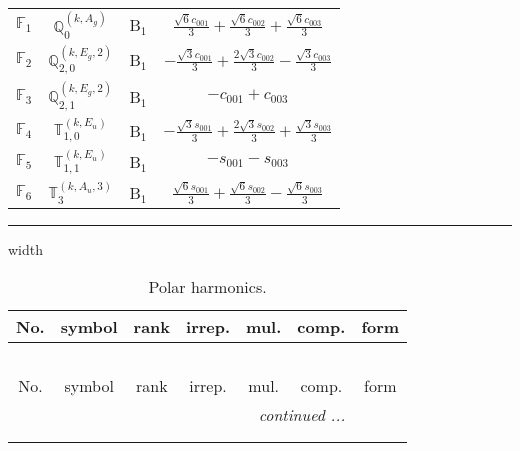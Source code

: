 \documentclass[fleqn,10pt,landscape]{article}
\begin{document}
\begin{itemize}
\begin{center}
\begin{longtable}{c|c|c|c}
$ \mathbb{F}_{1} $ & $\mathbb{Q}_{0}^{(k,A_{g})}$ & B$_{1}$ & $\frac{\sqrt{6} c_{001}}{3} + \frac{\sqrt{6} c_{002}}{3} + \frac{\sqrt{6} c_{003}}{3}$ \\
$ \mathbb{F}_{2} $ & $\mathbb{Q}_{2,0}^{(k,E_{g},2)}$ & B$_{1}$ & $- \frac{\sqrt{3} c_{001}}{3} + \frac{2 \sqrt{3} c_{002}}{3} - \frac{\sqrt{3} c_{003}}{3}$ \\
$ \mathbb{F}_{3} $ & $\mathbb{Q}_{2,1}^{(k,E_{g},2)}$ & B$_{1}$ & $- c_{001} + c_{003}$ \\
$ \mathbb{F}_{4} $ & $\mathbb{T}_{1,0}^{(k,E_{u})}$ & B$_{1}$ & $- \frac{\sqrt{3} s_{001}}{3} + \frac{2 \sqrt{3} s_{002}}{3} + \frac{\sqrt{3} s_{003}}{3}$ \\
$ \mathbb{F}_{5} $ & $\mathbb{T}_{1,1}^{(k,E_{u})}$ & B$_{1}$ & $- s_{001} - s_{003}$ \\
$ \mathbb{F}_{6} $ & $\mathbb{T}_{3}^{(k,A_{u},3)}$ & B$_{1}$ & $\frac{\sqrt{6} s_{001}}{3} + \frac{\sqrt{6} s_{002}}{3} - \frac{\sqrt{6} s_{003}}{3}$ \\
\end{longtable}
\end{center}

 \hfil \hrule height 1mm width \textwidth \hfil

\begin{center}
\renewcommand{\arraystretch}{1.3}
\begin{longtable}{ccccccc}
\caption{Polar harmonics.}
 \\
 \hline \hline
No. & symbol & rank & irrep. & mul. & comp. & form \\ \hline \endfirsthead

\multicolumn{6}{l}{\tablename\ \thetable{}} \\
 \hline \hline
No. & symbol & rank & irrep. & mul. & comp. & form \\ \hline \endhead

 \hline \hline
\multicolumn{6}{r}{\footnotesize\it continued ...} \\ \endfoot

 \hline \hline
\multicolumn{6}{r}{} \\ \endlastfoot


\end{longtable}
\end{center}
\end{itemize}
\end{document}
